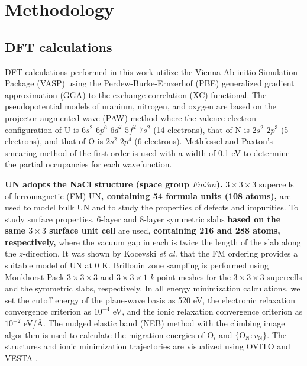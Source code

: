 \documentclass[preprint,12pt,sort&compress]{elsarticle}
\newcommand{\?}{\stackrel{?}{=}}
\providecommand{\DIFaddtex}[1]{{\bf #1}} %
\providecommand{\DIFdeltex}[1]{} %
\providecommand{\DIFaddbegin}{\protect\color{blue}} %
\providecommand{\DIFaddend}{\protect\color{black}} %
\providecommand{\DIFdelbegin}{\protect\color{red}} %
\providecommand{\DIFdelend}{\protect\color{black}} %
\providecommand{\DIFadd}[1]{\texorpdfstring{\DIFaddtex{#1}}{#1}} %
\providecommand{\DIFdel}[1]{\texorpdfstring{\DIFdeltex{#1}}{}} %
\newcommand{\DIFscaledelfig}{0.5}
\newlength{\DIFdelgraphicswidth} %
\newlength{\DIFdelgraphicsheight} %
\newcommand{\DIFaddincludegraphics}[2][]{{\color{blue}\fbox{\DIFOincludegraphics[#1]{#2}}}} %
\newcommand{\DIFdelincludegraphics}[2][]{%
\sbox{\DIFdelgraphicsbox}{\DIFOincludegraphics[#1]{#2}}%
\settoboxwidth{\DIFdelgraphicswidth}{\DIFdelgraphicsbox} %
\settoboxtotalheight{\DIFdelgraphicsheight}{\DIFdelgraphicsbox} %
\scalebox{\DIFscaledelfig}{%
\parbox[b]{\DIFdelgraphicswidth}{\usebox{\DIFdelgraphicsbox}\\[-\baselineskip] \rule{\DIFdelgraphicswidth}{0em}}\llap{\resizebox{\DIFdelgraphicswidth}{\DIFdelgraphicsheight}{%
\setlength{\unitlength}{\DIFdelgraphicswidth}%
\begin{picture}(1,1)%
\thicklines\linethickness{2pt} %
{\color[rgb]{1,0,0}\put(0,0){\framebox(1,1){}}}%
{\color[rgb]{1,0,0}\put(0,0){\line( 1,1){1}}}%
{\color[rgb]{1,0,0}\put(0,1){\line(1,-1){1}}}%
\end{picture}%
}\hspace*{3pt}}} %
} %
\DeclareRobustCommand{\DIFaddbegin}{\DIFOaddbegin \let\includegraphics\DIFaddincludegraphics} %
\DeclareRobustCommand{\DIFaddend}{\DIFOaddend \let\includegraphics\DIFOincludegraphics} %
\DeclareRobustCommand{\DIFdelbegin}{\DIFOdelbegin \let\includegraphics\DIFdelincludegraphics} %
\DeclareRobustCommand{\DIFdelend}{\DIFOaddend \let\includegraphics\DIFOincludegraphics} %
\begin{document}
\section{Methodology}

\subsection{DFT calculations}

DFT calculations performed in this work utilize the Vienna Ab-initio Simulation Package (VASP) \cite{Kresse1993, Kresse1996a, Kresse1996b} using the Perdew-Burke-Ernzerhof (PBE) \cite{Perdew1996} generalized gradient approximation (GGA) to the exchange-correlation (XC) functional. The pseudopotential models of uranium, nitrogen, and oxygen are based on the projector augmented wave (PAW) method \cite{Kresse1999} where the valence electron configuration of U is $6s^2$ $6p^6$ $6d^2$ $5f^2$ $7s^2$ (14 electrons), that of N is $2s^2$ $2p^3$ (5 electrons), and that of O is $2s^2$ $2p^4$ (6 electrons). Methfessel and Paxton’s smearing method \cite{Methfessel1989} of the first order is used with a width of 0.1 eV to determine the partial occupancies for each wavefunction.
\DIFaddbegin 

\DIFadd{UN adopts the NaCl structure (space group $Fm\bar{3}m$). }\DIFaddend $3 \times 3 \times 3$ supercells of ferromagnetic (FM) UN\DIFaddbegin \DIFadd{, containing 54 formula units (108 atoms), }\DIFaddend are used to model bulk UN and to study the properties of defects and impurities. To study surface properties, 6-layer and 8-layer symmetric slabs \DIFdelbegin \DIFdel{of FM UN }\DIFdelend \DIFaddbegin \DIFadd{based on the same $3 \times 3$ surface unit cell }\DIFaddend are used, \DIFaddbegin \DIFadd{containing 216 and 288 atoms, respectively, }\DIFaddend where the vacuum gap in each is twice the length of the slab along the $z$-direction. It was shown by Kocevski \textit{et al.}
\cite{Kocevski2022I} that the FM ordering provides a suitable model of UN at 0 K. Brillouin zone sampling is performed using Monkhorst-Pack \cite{Monkhorst1976} $3 \times 3 \times 3$ and $3 \times 3 \times 1$ \textit{k}-point meshes for the $3 \times 3 \times 3$ supercells and the symmetric slabs, respectively. In all energy minimization calculations, we set the cutoff energy of the plane-wave basis as 520 eV, the electronic relaxation convergence criterion as $10^{-4}$ eV, and the ionic relaxation convergence criterion as $10^{-2}$ eV/\AA. The nudged elastic band (NEB) method \cite{Henkelman2000a} with the climbing image algorithm \cite{Henkelman2000b} is used to calculate the migration energies of O$_i$ and $\{\text{O}_\text{N} \! : \! v_\text{N}\}$. The structures and ionic minimization trajectories are visualized using OVITO \cite{Stukowski2010} and VESTA \cite{Momma2008}.
\end{document}
